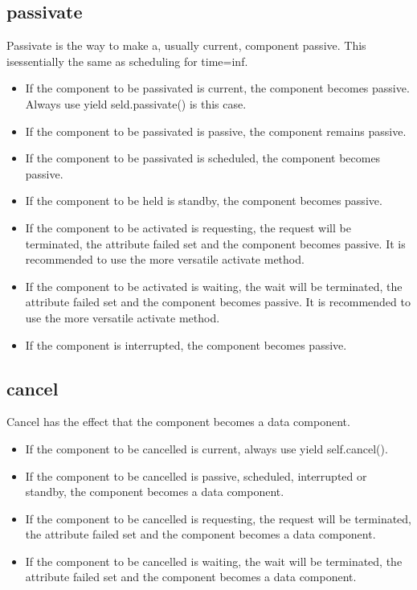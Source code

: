\documentclass[letterpaper,10pt,english]{sphinxmanual}
\begin{document}
\subsection{passivate}
\label{\detokenize{Component:passivate}}
Passivate is the way to make a, usually current, component passive. This isessentially the
same as scheduling for time=inf.
\begin{itemize}
\item {} 
If the component to be passivated is current, the component becomes passive. Always
use yield seld.passivate() is this case.

\item {} 
If the component to be passivated is passive, the component remains passive.

\item {} 
If the component to be passivated is scheduled, the component becomes passive.

\item {} 
If the component to be held is standby, the component becomes passive.

\item {} 
If the component to be activated is requesting, the request will be terminated, the attribute failed
set and the component becomes passive. It is recommended to use the more versatile activate method.

\item {} 
If the component to be activated is waiting, the wait will be
terminated, the attribute failed set and the component becomes passive. It is recommended to
use the more versatile activate method.

\item {} 
If the component is interrupted, the component becomes passive.

\end{itemize}


\subsection{cancel}
\label{\detokenize{Component:cancel}}
Cancel has the effect that the component becomes a data component.
\begin{itemize}
\item {} 
If the component to be cancelled is current, always use yield self.cancel().

\item {} 
If the component to be cancelled is passive, scheduled, interrupted  or standby, the component
becomes a data component.

\item {} 
If the component to be cancelled is requesting, the request will be terminated, the attribute failed
set and the component becomes a data component.

\item {} 
If the component to be cancelled is waiting, the wait will be terminated, the attribute failed
set and the component becomes a data component.

\end{itemize}
\end{document}
